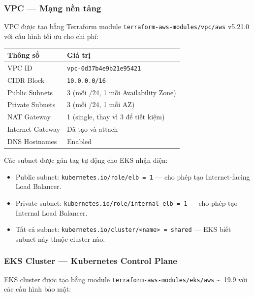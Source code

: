 \documentclass[12pt,a4paper]{article}
\begin{document}
\subsubsection{VPC — Mạng nền tảng}

VPC được tạo bằng Terraform module \texttt{terraform-aws-modules/vpc/aws} v5.21.0 với cấu hình tối ưu cho chi phí:

\begin{table}[H]
\centering
\begin{tabular}{@{}ll@{}}
\toprule
\textbf{Thông số}         & \textbf{Giá trị} \\
\midrule
VPC ID                    & \texttt{vpc-0d37b4e9b21e95421} \\
CIDR Block                & \texttt{10.0.0.0/16} \\
Public Subnets            & 3 (mỗi /24, 1 mỗi Availability Zone) \\
Private Subnets           & 3 (mỗi /24, 1 mỗi AZ) \\
NAT Gateway               & 1 (single, thay vì 3 để tiết kiệm) \\
Internet Gateway          & Đã tạo và attach \\
DNS Hostnames             & Enabled \\
\end{tabular}
\end{table}

Các subnet được gán tag tự động cho EKS nhận diện:

\begin{itemize}[leftmargin=*,nosep]
  \item Public subnet: \texttt{kubernetes.io/role/elb = 1} — cho phép tạo Internet-facing Load Balancer.
  \item Private subnet: \texttt{kubernetes.io/role/internal-elb = 1} — cho phép tạo Internal Load Balancer.
  \item Tất cả subnet: \texttt{kubernetes.io/cluster/<name> = shared} — EKS biết subnet này thuộc cluster nào.
\end{itemize}

\subsubsection{EKS Cluster — Kubernetes Control Plane}

EKS cluster được tạo bằng module \texttt{terraform-aws-modules/eks/aws} \textasciitilde\ 19.9 với các cấu hình bảo mật:
\end{document}
